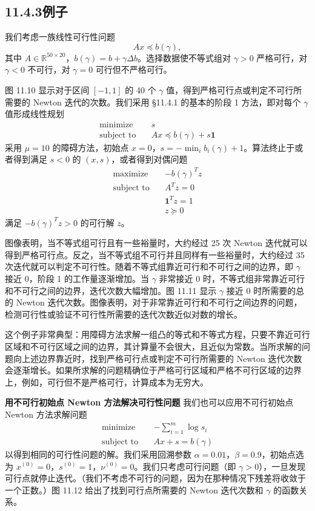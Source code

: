 \documentclass[UTF8, 12pt, fontset=fandol, oneside]{ctexart}
\begin{document}
\subsection*{11.4.3\quad 例子}

我们考虑一族线性可行性问题
\[
Ax\preceq b(\gamma),
\]
其中 $A\in\mathbb{R}^{50\times 20}$，$b(\gamma)=b+\gamma\Delta b$。选择数据使不等式组对 $\gamma>0$ 严格可行，对 $\gamma<0$ 不可行，对 $\gamma=0$ 可行但不严格可行。

图 11.10 显示对于区间 $[-1,1]$ 的 40 个 $\gamma$ 值，得到严格可行点或判定不可行所需要的 Newton 迭代的次数。我们采用 \S11.4.1 的基本的阶段 1 方法，即对每个 $\gamma$ 值形成线性规划
\[
\begin{aligned}
\text{minimize}\quad & s\\
\text{subject to}\quad & Ax\preceq b(\gamma)+s\mathbf{1}
\end{aligned}
\]
采用 $\mu=10$ 的障碍方法，初始点 $x=0$，$s=-\min_i b_i(\gamma)+1$。算法终止于或者得到满足 $s<0$ 的 $(x,s)$，或者得到对偶问题
\[
\begin{aligned}
\text{maximize}\quad & -b(\gamma)^Tz\\
\text{subject to}\quad & A^Tz=0\\
& \mathbf{1}^Tz=1\\
& z\succeq 0
\end{aligned}
\]
满足 $-b(\gamma)^Tz>0$ 的可行解 $z$。

图像表明，当不等式组可行且有一些裕量时，大约经过 25 次 Newton 迭代就可以得到严格可行点。反之，当不等式组不可行并且同样有一些裕量时，大约经过 35 次迭代就可以判定不可行性。随着不等式组靠近可行和不可行之间的边界，即 $\gamma$ 接近 0，阶段 1 的工作量逐渐增加。当 $\gamma$ 非常接近 0 时，不等式组非常靠近可行和不可行之间的边界，迭代次数大幅增加。图 11.11 显示 $\gamma$ 接近 0 时所需要的总的 Newton 迭代次数。图像表明，对于非常靠近可行和不可行之间边界的问题，检测可行性或验证不可行性所需要的迭代次数近似对数的增长。

这个例子非常典型：用障碍方法求解一组凸的等式和不等式方程，只要不靠近可行区域和不可行区域之间的边界，其计算量不会很大，且近似为常数。当所求解的问题向上述边界靠近时，找到严格可行点或判定不可行所需要的 Newton 迭代次数会逐渐增长。如果所求解的问题精确位于严格可行区域和严格不可行区域的边界上，例如，可行但不是严格可行，计算成本为无穷大。

\noindent\textbf{用不可行初始点 Newton 方法解决可行性问题}\quad
我们也可以应用不可行初始点 Newton 方法求解问题
\[
\begin{aligned}
\text{minimize}\quad & -\sum_{i=1}^m\log s_i\\
\text{subject to}\quad & Ax+s=b(\gamma)
\end{aligned}
\]
以得到相同的可行性问题的解。我们采用回溯参数 $\alpha=0.01$，$\beta=0.9$，初始点选为 $x^{(0)}=0$，$s^{(0)}=1$，$\nu^{(0)}=0$。我们只考虑可行问题（即 $\gamma>0$），一旦发现可行点就停止迭代。（我们不考虑不可行的问题，因为在那种情况下残差将收敛于一个正数。）图 11.12 给出了找到可行点所需要的 Newton 迭代次数和 $\gamma$ 的函数关系。
\end{document}
